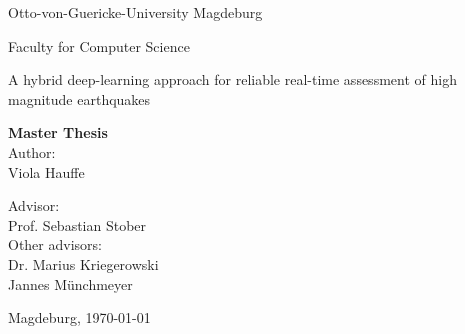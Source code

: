 \documentclass[thesis.tex]{subfiles}
\begin{document}
\thispagestyle {empty}


\begin{center}
	\begin{large}
		Otto-von-Guericke-University Magdeburg\\
		
		
		\vspace{1mm}
		
		\normalsize{Faculty for Computer Science}\\
	\end{large}
	
	

	\vspace{20mm}
		\begin{Huge}
			A hybrid deep-learning approach for reliable real-time assessment of high magnitude earthquakes
			\\
		\end{Huge}
	\vspace{25mm}

	{\Huge \textbf{Master Thesis}}\\
	\vspace{25mm}
	Author:\\
	\vspace{2mm}
	{\Large Viola Hauffe}\\
	
	\vspace{20mm}
	
	Advisor:\\
	\vspace{1mm}
	{\large Prof. Sebastian Stober}\\
	\vspace{4mm}
	Other advisors:\\
	\vspace{1mm}
	{\large Dr. Marius Kriegerowski}\\
	{\large Jannes Münchmeyer}\\
	\vspace{10mm}
	
	
	{\large Magdeburg, \today}\\
	
	

\end{center}
\end{document}
